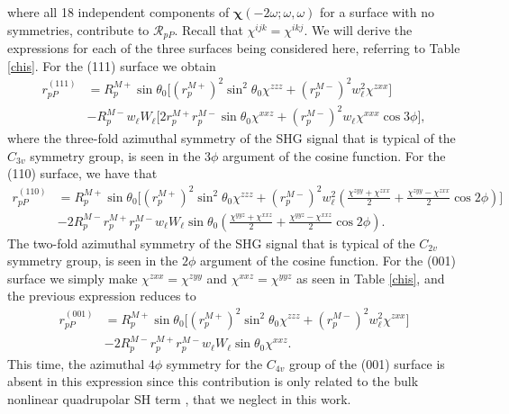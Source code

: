 where all 18 independent components of
$\boldsymbol{\chi}(-2\omega;\omega,\omega)$ for a surface with no symmetries,
contribute to $\mathcal{R}_{pP}$. Recall that $\chi^{ijk}=\chi^{ikj}$. We will
derive  the expressions for each of the three surfaces being considered here,
referring to Table \ref{chis}. For the (111) surface we obtain
\begin{equation}\label{eq:rpp111}
\begin{split}
r^{(111)}_{pP} &= 
R^{M+}_{p}\sin\theta_{0}
\Big[
  \left(r^{M+}_{p}\right)^{2}\sin^{2}\theta_{0}\chi^{zzz}
+ \left(r^{M-}_{p}\right)^{2}w^{2}_{\ell}\chi^{zxx}
\Big]\\
&- R^{M-}_{p}w_{\ell}W_{\ell}
\Big[
  2r^{M+}_{p}r^{M-}_{p}\sin\theta_{0}\chi^{xxz}
+ \left(r^{M-}_{p}\right)^{2}w_{\ell}\chi^{xxx}\cos3\phi
\Big],
\end{split}
\end{equation}
where the three-fold azimuthal symmetry of the SHG signal that is typical of the
$C_{3v}$ symmetry group, is seen in the $3\phi$ argument of the cosine function.
For the (110) surface, we have that
\begin{equation}\label{eq:rpp110}
\begin{split}
r^{(110)}_{pP} &= 
R^{M+}_{p}\sin\theta_{0}
\Bigg[
  \left(r^{M+}_{p}\right)^{2}\sin^{2}\theta_{0}\chi^{zzz}
+ \left(r^{M-}_{p}\right)^{2}w^{2}_{\ell}
\left(
\frac{\chi^{zyy} + \chi^{zxx}}{2} + \frac{\chi^{zyy} - \chi^{zxx}}{2}\cos2\phi 
\right) 
\Bigg]\\
&- 2R^{M-}_{p}r^{M+}_{p}r^{M-}_{p}w_{\ell}W_{\ell}\sin\theta_{0}
\left(
\frac{\chi^{yyz} + \chi^{xxz}}{2} + \frac{\chi^{yyz} - \chi^{xxz}}{2}\cos2\phi 
\right). 
\end{split}
\end{equation}
The two-fold azimuthal symmetry of the SHG signal that is typical of the
$C_{2v}$ symmetry group, is seen in the $2\phi$ argument of the cosine function.
For the (001) surface we simply make $\chi^{zxx}=\chi^{zyy}$ and
$\chi^{xxz}=\chi^{yyz}$ as seen in Table \ref{chis}, and the previous expression
reduces to
\begin{equation}\label{rpp001}
\begin{split}
r^{(001)}_{pP} &= 
R^{M+}_{p}\sin\theta_{0}
\bigg[
  \left(r^{M+}_{p}\right)^{2}\sin^{2}\theta_{0}\chi^{zzz}
+ \left(r^{M-}_{p}\right)^{2}w^{2}_{\ell}\chi^{zxx}
\bigg]\\
&- 2R^{M-}_{p}r^{M+}_{p}r^{M-}_{p}w_{\ell}W_{\ell}\sin\theta_{0}\chi^{xxz}.
\end{split}
\end{equation}
This time, the azimuthal $4\phi$ symmetry for the $C_{4v}$ group of the (001)
surface is absent in this  expression since this contribution is only related to
the bulk nonlinear quadrupolar SH term \cite{sipePRB87}, that we neglect in this
work.


